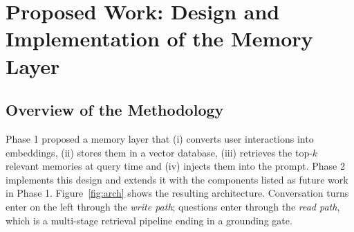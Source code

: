 \chapter{Proposed Work: Design and Implementation of the Memory Layer}

\section{Overview of the Methodology}
Phase 1 proposed a memory layer that (i) converts user interactions into embeddings, (ii) stores them in a
vector database, (iii) retrieves the top-$k$ relevant memories at query time and (iv) injects them into the
prompt. Phase 2 implements this design and extends it with the components listed as future work in Phase 1.
Figure~\ref{fig:arch} shows the resulting architecture. Conversation turns enter on the left through the
\emph{write path}; questions enter through the \emph{read path}, which is a multi-stage retrieval pipeline
ending in a grounding gate.


